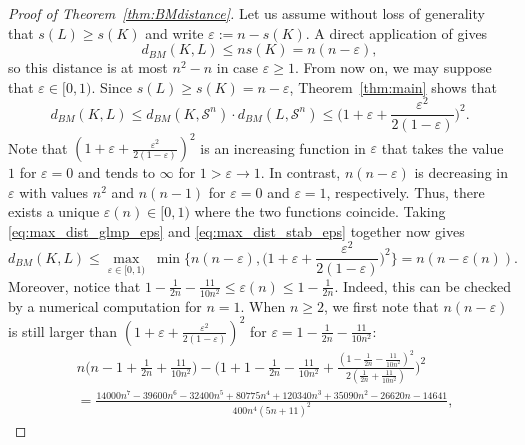 \documentclass{amsart}
\newcommand{\simplex}[1]{\mathcal{S}^{#1}}
\begin{document}
\begin{proof}[Proof of Theorem~\ref{thm:BMdistance}]
Let us assume without loss of generality that $s(L) \geq s(K)$ and write $\varepsilon := n - s(K)$.
A direct application of \cite[Corollary~$5.10$]{2004:GoLiMePa} gives
\begin{equation} \label{eq:max_dist_glmp_eps}
    d_{BM}(K,L)
    \leq n s(K)
    = n (n - \varepsilon),
\end{equation}
so this distance is at most $n^2 - n$ in case $\varepsilon \geq 1$.
From now on, we may suppose that $\varepsilon \in [0,1)$.
Since $s(L) \geq s(K) = n - \varepsilon$,
Theorem~\ref{thm:main} shows that
\begin{equation} \label{eq:max_dist_stab_eps}
    d_{BM}(K,L)
    \leq d_{BM}(K,\simplex{n}) \cdot d_{BM}(L,\simplex{n})
    \leq \bigg(1 + \varepsilon + \frac{\varepsilon^2}{2(1-\varepsilon)} \bigg)^2.
\end{equation}
Note that $(1+\varepsilon+\frac{\varepsilon^2}{2(1-\varepsilon)})^2$ is an increasing function in $\varepsilon$ that takes the value $1$ for $\varepsilon = 0$ and tends to $\infty$ for $1 > \varepsilon \to 1$.
In contrast, $n (n - \varepsilon)$ is decreasing in $\varepsilon$ with values $n^2$ and $n (n-1)$ for $\varepsilon = 0$ and $\varepsilon = 1$, respectively.
Thus, there exists a unique $\varepsilon(n) \in [0,1)$ where the two functions coincide.
Taking \eqref{eq:max_dist_glmp_eps} and \eqref{eq:max_dist_stab_eps} together now gives
\begin{equation}\label{eq:minDist}
    d_{BM}(K,L)
    \leq \max_{\varepsilon \in [0,1)} \; \min \Bigg\{ n(n-\varepsilon), \bigg(1+\varepsilon+\frac{\varepsilon^2}{2(1-\varepsilon)}\bigg)^2 \Bigg\}
    = n (n-\varepsilon(n)).
\end{equation}
Moreover, notice that $1 - \frac{1}{2n} - \frac{11}{10n^2} \leq \varepsilon(n) \leq 1 - \frac{1}{2n}$.
Indeed, this can be checked by a numerical computation for $n = 1$.
When $n \geq 2$, we first note that $n (n-\varepsilon)$ is still larger than $(1+\varepsilon+\frac{\varepsilon^2}{2(1-\varepsilon)})^2$ for $\varepsilon = 1 - \frac{1}{2n} - \frac{11}{10n^2}$:
\begin{align*}
    & n \bigg( n-1+\frac{1}{2n} + \frac{11}{10n^2} \bigg) - \Bigg( 1+1-\frac{1}{2n} - \frac{11}{10n^2} + \frac{(1-\frac{1}{2n}-\frac{11}{10n^2})^2}{2(\frac{1}{2n} + \frac{11}{10n^2})} \Bigg)^2
    \\
    & = \frac{14000 n^7 - 39600 n^6 - 32400 n^5 + 80775 n^4 + 120340 n^3 + 35090 n^2 - 26620 n - 14641}{400 n^4 (5 n + 11)^2},

\end{align*}
\end{proof}
\end{document}
